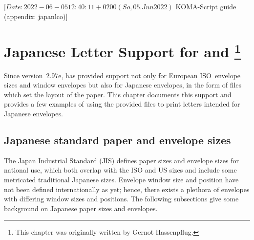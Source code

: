 %
%
%
%
%
%
%
%
%

                 [$Date: 2022-06-05 12:40:11 +0200 (So, 05. Jun 2022) $
                  KOMA-Script guide (appendix: japanlco)]

\appendix

\chapter[{Japanese Letter Support for \Class{scrlttr2}} and \Package{scrletter}]
{Japanese Letter Support for  and \footnote{This chapter was
    originally written by Gernot Hassenpflug.}}
 

Since version~2.97e, \KOMAScript{} has provided support not only for
European ISO~envelope sizes and window envelopes but also for Japanese
envelopes, in the form of  files which set the layout of the paper.
This chapter documents this support and provides a few examples of using the
provided  files to print letters intended for Japanese envelopes.

\section{Japanese standard paper and envelope sizes}

The Japan Industrial Standard (JIS) defines paper sizes and envelope sizes for
national use, which both overlap with the ISO and US sizes and include some
metricated traditional Japanese sizes. Envelope window size and position have
not been defined internationally as yet; hence, there exists a plethora of
envelopes with differing window sizes and positions. The following subsections
give some background on Japanese paper sizes and envelopes.

